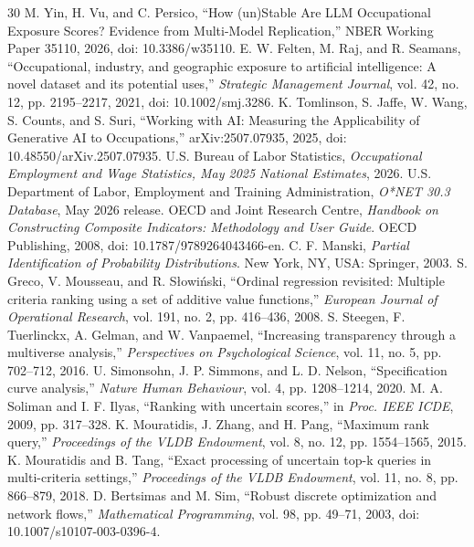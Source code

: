 \documentclass[conference]{IEEEtran}
\begin{document}
\begin{thebibliography}{30}\footnotesize
{} M. Yin, H. Vu, and C. Persico, ``How (un)Stable Are LLM Occupational Exposure Scores? Evidence from Multi-Model Replication,'' NBER Working Paper 35110, 2026, doi: 10.3386/w35110.
 E. W. Felten, M. Raj, and R. Seamans, ``Occupational, industry, and geographic exposure to artificial intelligence: A novel dataset and its potential uses,'' \emph{Strategic Management Journal}, vol. 42, no. 12, pp. 2195--2217, 2021, doi: 10.1002/smj.3286.
 K. Tomlinson, S. Jaffe, W. Wang, S. Counts, and S. Suri, ``Working with AI: Measuring the Applicability of Generative AI to Occupations,'' arXiv:2507.07935, 2025, doi: 10.48550/arXiv.2507.07935.
 U.S. Bureau of Labor Statistics, \emph{Occupational Employment and Wage Statistics, May 2025 National Estimates}, 2026.
 U.S. Department of Labor, Employment and Training Administration, \emph{O*NET 30.3 Database}, May 2026 release.
 OECD and Joint Research Centre, \emph{Handbook on Constructing Composite Indicators: Methodology and User Guide}. OECD Publishing, 2008, doi: 10.1787/9789264043466-en.
 C. F. Manski, \emph{Partial Identification of Probability Distributions}. New York, NY, USA: Springer, 2003.
 S. Greco, V. Mousseau, and R. S\l{}owi\'nski, ``Ordinal regression revisited: Multiple criteria ranking using a set of additive value functions,'' \emph{European Journal of Operational Research}, vol. 191, no. 2, pp. 416--436, 2008.
 S. Steegen, F. Tuerlinckx, A. Gelman, and W. Vanpaemel, ``Increasing transparency through a multiverse analysis,'' \emph{Perspectives on Psychological Science}, vol. 11, no. 5, pp. 702--712, 2016.
 U. Simonsohn, J. P. Simmons, and L. D. Nelson, ``Specification curve analysis,'' \emph{Nature Human Behaviour}, vol. 4, pp. 1208--1214, 2020.
 M. A. Soliman and I. F. Ilyas, ``Ranking with uncertain scores,'' in \emph{Proc. IEEE ICDE}, 2009, pp. 317--328.
 K. Mouratidis, J. Zhang, and H. Pang, ``Maximum rank query,'' \emph{Proceedings of the VLDB Endowment}, vol. 8, no. 12, pp. 1554--1565, 2015.
 K. Mouratidis and B. Tang, ``Exact processing of uncertain top-k queries in multi-criteria settings,'' \emph{Proceedings of the VLDB Endowment}, vol. 11, no. 8, pp. 866--879, 2018.
 D. Bertsimas and M. Sim, ``Robust discrete optimization and network flows,'' \emph{Mathematical Programming}, vol. 98, pp. 49--71, 2003, doi: 10.1007/s10107-003-0396-4.

\end{thebibliography}
\end{document}

